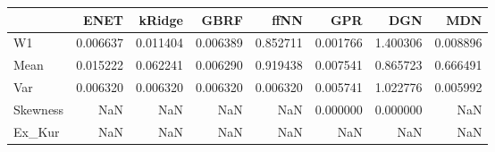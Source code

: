 \begin{tabular}{lrrrrrrr}
\toprule
{} &      ENET &    kRidge &      GBRF &      ffNN &       GPR &       DGN &       MDN \\
\midrule
W1       &  0.006637 &  0.011404 &  0.006389 &  0.852711 &  0.001766 &  1.400306 &  0.008896 \\
Mean     &  0.015222 &  0.062241 &  0.006290 &  0.919438 &  0.007541 &  0.865723 &  0.666491 \\
Var      &  0.006320 &  0.006320 &  0.006320 &  0.006320 &  0.005741 &  1.022776 &  0.005992 \\
Skewness &       NaN &       NaN &       NaN &       NaN &  0.000000 &  0.000000 &       NaN \\
Ex\_Kur   &       NaN &       NaN &       NaN &       NaN &       NaN &       NaN &       NaN \\
\bottomrule
\end{tabular}
